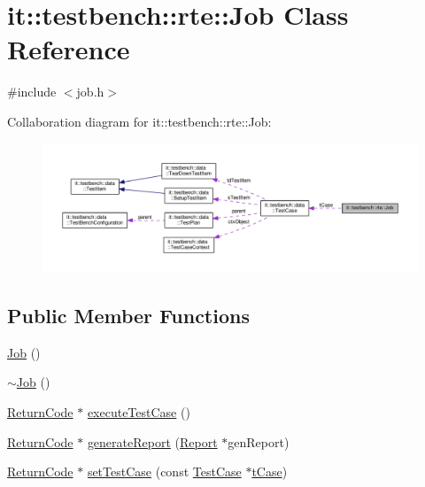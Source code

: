\hypertarget{classit_1_1testbench_1_1rte_1_1Job}{\section{it\-:\-:testbench\-:\-:rte\-:\-:Job Class Reference}
\label{d2/d1b/classit_1_1testbench_1_1rte_1_1Job}
}


{\ttfamily \#include $<$job.\-h$>$}



Collaboration diagram for it\-:\-:testbench\-:\-:rte\-:\-:Job\-:
\nopagebreak
\begin{figure}[H]
\begin{center}
\leavevmode
\includegraphics[width=350pt]{d7/d6f/classit_1_1testbench_1_1rte_1_1Job__coll__graph}
\end{center}
\end{figure}
\subsection*{Public Member Functions}
\begin{DoxyCompactItemize}
\item 
\hyperlink{classit_1_1testbench_1_1rte_1_1Job_a905ef9eecf19f742af60d9f3d18d5e82}{Job} ()
\item 
\hyperlink{classit_1_1testbench_1_1rte_1_1Job_a408e03f5a32458b1fd2070e0d278b236}{$\sim$\-Job} ()
\item 
\hyperlink{structit_1_1testbench_1_1data_1_1ReturnCode}{Return\-Code} $\ast$ \hyperlink{classit_1_1testbench_1_1rte_1_1Job_abe859815dff77b6a4a860dfe67f5f7a8}{execute\-Test\-Case} ()
\item 
\hyperlink{structit_1_1testbench_1_1data_1_1ReturnCode}{Return\-Code} $\ast$ \hyperlink{classit_1_1testbench_1_1rte_1_1Job_ae0cc3d2e7578ad37cba7a8cbe69bf7f1}{generate\-Report} (\hyperlink{classit_1_1testbench_1_1data_1_1Report}{Report} $\ast$gen\-Report)
\item 
\hyperlink{structit_1_1testbench_1_1data_1_1ReturnCode}{Return\-Code} $\ast$ \hyperlink{classit_1_1testbench_1_1rte_1_1Job_a4fa3d5e3755f3acc83ad6cf4ee57225c}{set\-Test\-Case} (const \hyperlink{classit_1_1testbench_1_1data_1_1TestCase}{Test\-Case} $\ast$\hyperlink{classit_1_1testbench_1_1rte_1_1Job_ade77aa87844c9e4592804cd21a1fade9}{t\-Case})
\end{DoxyCompactItemize}
